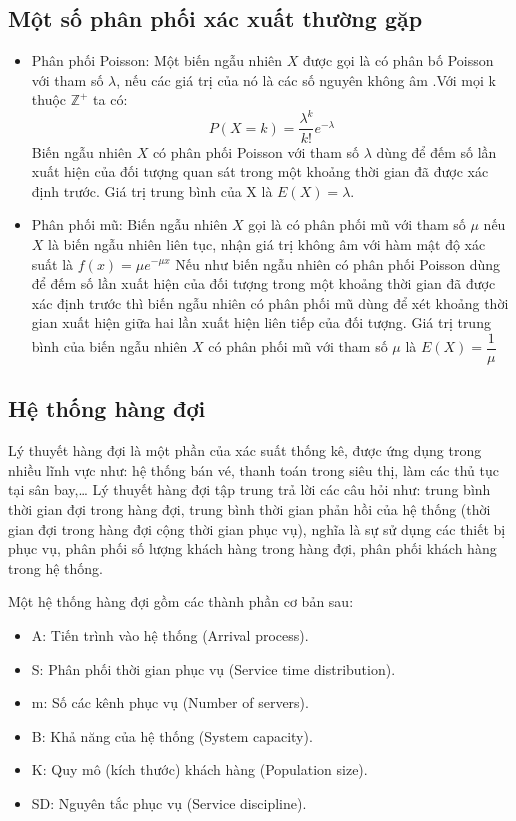 \documentclass[a4paper]{article}
\begin{document}
\subsection{Một số phân phối xác xuất thường gặp}
\begin{itemize}
\item Phân phối Poisson: Một biến ngẫu nhiên $X$ được gọi là có phân bố Poisson với tham số $\lambda$, nếu các giá trị của nó là các số nguyên không âm .Với mọi k thuộc $\mathbb{Z^+}$ ta có:
\begin{equation*}
P(X=k)=\dfrac{{\lambda}^{k}}{k!}e^{-\lambda}
\end{equation*}
\subitem Biến ngẫu nhiên $X$ có phân phối Poisson với tham số $\lambda$ dùng để đếm số lần xuất hiện của đối tượng quan sát trong một khoảng thời gian đã được xác định trước. Giá trị trung bình của X là $E(X) = \lambda$.
\item Phân phối mũ: Biến ngẫu nhiên $X$ gọi là có phân phối mũ với tham số $\mu$ nếu $X$ là biến ngẫu nhiên liên tục, nhận giá trị không âm với hàm mật độ xác suất là $f(x)={\mu}e^{-{\mu}x}$
\subitem Nếu như biến ngẫu nhiên có phân phối Poisson dùng để đếm số lần xuất hiện của đối tượng trong một khoảng thời gian đã được xác định trước thì biến ngẫu nhiên có phân phối mũ dùng để xét khoảng thời gian xuất hiện giữa hai lần xuất hiện liên tiếp của đối tượng. Giá trị trung bình của biến ngẫu nhiên $X$ có phân phối mũ với tham số $\mu$ là $E(X)=\dfrac{1}{\mu}$
\end{itemize}
\subsection{Hệ thống hàng đợi}
Lý thuyết hàng đợi là một phần của xác suất thống kê, được ứng dụng trong nhiều lĩnh vực như: hệ thống bán vé, thanh toán trong siêu thị, làm các thủ tục tại sân bay,… Lý thuyết hàng đợi tập trung trả lời các câu hỏi như: trung bình thời gian đợi trong hàng đợi, trung bình thời gian phản hồi của hệ thống (thời gian đợi trong hàng đợi cộng thời gian phục vụ), nghĩa là sự sử dụng các thiết bị phục vụ, phân phối số lượng khách hàng trong hàng đợi, phân phối khách hàng trong hệ thống.\par
Một hệ thống hàng đợi gồm các thành phần cơ bản sau:
\begin{itemize}
\item A: Tiến trình vào hệ thống (Arrival process).
\item S: Phân phối thời gian phục vụ (Service time distribution).
\item m: Số các kênh phục vụ (Number of servers).
\item B: Khả năng của hệ thống (System capacity).
\item K: Quy mô (kích thước) khách hàng (Population size).
\item SD: Nguyên tắc phục vụ (Service discipline).
\end{itemize}	
\end{document}
